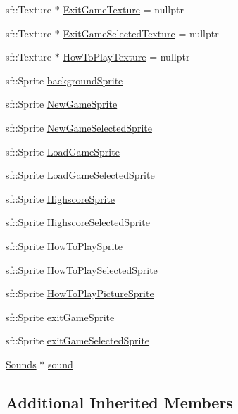 \begin{DoxyCompactItemize}
\item 
sf\+::\+Texture $\ast$ \hyperlink{classStateMainMenu_a7170389c3a31a58f8bdd06b1bd36d9b7}{Exit\+Game\+Texture} = nullptr
\item 
sf\+::\+Texture $\ast$ \hyperlink{classStateMainMenu_ac42fbbb2cf5c1f8031bc41753cf6ef10}{Exit\+Game\+Selected\+Texture} = nullptr
\item 
sf\+::\+Texture $\ast$ \hyperlink{classStateMainMenu_a6f376b471cd23501af052628209cabd4}{How\+To\+Play\+Texture} = nullptr
\item 
sf\+::\+Sprite \hyperlink{classStateMainMenu_a9885f1391d304c1567feaa48aee40587}{background\+Sprite}
\item 
sf\+::\+Sprite \hyperlink{classStateMainMenu_adc3e471543be20775b7c8272c8660991}{New\+Game\+Sprite}
\item 
sf\+::\+Sprite \hyperlink{classStateMainMenu_a3307dac9269a6515ae9e1563487c413b}{New\+Game\+Selected\+Sprite}
\item 
sf\+::\+Sprite \hyperlink{classStateMainMenu_a309cb7c0187583ea7e984d59e77c0978}{Load\+Game\+Sprite}
\item 
sf\+::\+Sprite \hyperlink{classStateMainMenu_ac90a9dbfa8ec5f26b576e27afbc389a1}{Load\+Game\+Selected\+Sprite}
\item 
sf\+::\+Sprite \hyperlink{classStateMainMenu_a52b1859470406294eb22fc86a8f16453}{Highscore\+Sprite}
\item 
sf\+::\+Sprite \hyperlink{classStateMainMenu_a3b058162bfa6c0bcaab50a7563720159}{Highscore\+Selected\+Sprite}
\item 
sf\+::\+Sprite \hyperlink{classStateMainMenu_aa5c71ce1a86be4f06055ed291037a10f}{How\+To\+Play\+Sprite}
\item 
sf\+::\+Sprite \hyperlink{classStateMainMenu_afaff9d33a337f71aef9fe757f35f4162}{How\+To\+Play\+Selected\+Sprite}
\item 
sf\+::\+Sprite \hyperlink{classStateMainMenu_a6cc04c69495bf5d7469c21d44e901a67}{How\+To\+Play\+Picture\+Sprite}
\item 
sf\+::\+Sprite \hyperlink{classStateMainMenu_a1640dc6e497a1d7f83a57886d31aa456}{exit\+Game\+Sprite}
\item 
sf\+::\+Sprite \hyperlink{classStateMainMenu_a114cf646751b0b7a6ca4486a1c7227da}{exit\+Game\+Selected\+Sprite}
\item 
\hyperlink{classSounds}{Sounds} $\ast$ \hyperlink{classStateMainMenu_a6095be3835bac4e3de32ff1700cf8dcd}{sound}
\end{DoxyCompactItemize}
\subsection*{Additional Inherited Members}



